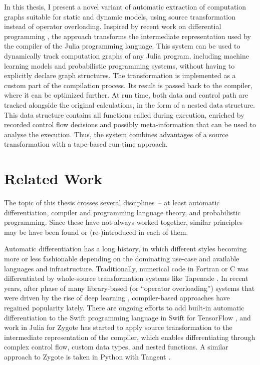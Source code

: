 In this thesis, I present a novel variant of automatic extraction of computation graphs suitable for
static and dynamic models, using source transformation instead of operator overloading.  Inspired by
recent work on differential programming \parencite{innes2018don}, the approach transforms the
intermediate representation used by the compiler of the Julia programming language.  This system can
be used to dynamically track computation graphs of any Julia program, including machine learning
models and probabilistic programming systems, without having to explicitly declare graph
structures. The transformation is implemented as a custom part of the compilation process.  Its
result is passed back to the compiler, where it can be optimized further. At run time, both data and
control path are tracked alongside the original calculations, in the form of a nested data
structure.  This data structure contains all functions called during execution, enriched by recorded
control flow decisions and possibly meta-information that can be used to analyse the
execution. Thus, the system combines advantages of a source transformation with a tape-based run-time
approach.


\section{Related Work}
\label{sec:related-work}

The topic of this thesis crosses several disciplines~-- at least automatic differentiation, compiler
and programming language theory, and probabilistic programming.  Since these have not always worked
together, similar principles may be have been found or (re-)introduced in each of them.

Automatic differentiation has a long history, in which different styles becoming more or less
fashionable depending on the dominating use-case and available languages and infrastructure.
Traditionally, numerical code in Fortran or C was differentiated by whole-source transformation
systems like Tapenade \parencite{tapenadedevelopers2019tapenade}.  In recent years, after phase of
many library-based (or \enquote{operator overloading}) systems that were driven by the rise of deep
learning \parencite{abadi2015tensorflow,paszke2017automatic,neubig2017dynet,tokui2015chainer},
compiler-based approaches have regained popularity lately.  There are ongoing efforts to add
built-in automatic differentiation to the Swift programming language in Swift for TensorFlow
\parencite{tensorflowdevelopers2018swift}, and work in Julia for Zygote \parencite{innes2018don} has
started to apply source transformation to the intermediate representation of the compiler, which
enables differentiating through complex control flow, custom data types, and nested functions.  A
similar approach to Zygote is taken in Python with Tangent \parencite{vanmerrienboer2018tangent}.

